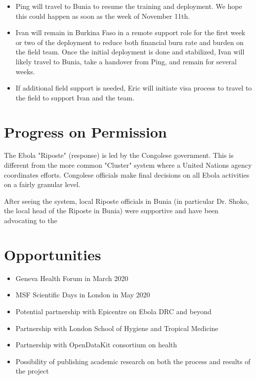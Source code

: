 \documentclass[a4paper,12pt,twoside]{article}
\begin{document}
\begin{itemize}
    \item Ping will travel to Bunia to resume the training and deployment. We hope this could happen as soon as the week of November 11th.
    \item Ivan will remain in Burkina Faso in a remote support role for the first week or two of the deployment to reduce both financial burn rate and burden on the field team. Once the initial deployment is done and stabilized, Ivan will likely travel to Bunia, take a handover from Ping, and remain for several weeks.
    \item If additional field support is needed, Eric will initiate visa process to travel to the field to support Ivan and the team.
\end{itemize}

\section{Progress on Permission}

The Ebola "Riposte" (response) is led by the Congolese government. This is different from the more common "Cluster" system where a United Nations agency coordinates efforts. Congolese officials make final decisions on all Ebola activities on a fairly granular level.

After seeing the system, local Riposte officials in Bunia (in particular Dr. Shoko, the local head of the Riposte in Bunia) were supportive and have been advocating to the 


\section{Opportunities}
\begin{itemize}
    \item Geneva Health Forum in March 2020
    \item MSF Scientific Days in London in May 2020
    \item Potential partnership with Epicentre on Ebola DRC and beyond
    \item Partnership with London School of Hygiene and Tropical Medicine
    \item Partnership with OpenDataKit consortium on health
    \item Possibility of publishing academic research on both the process and results of the project
    
\end{itemize}
\end{document}
